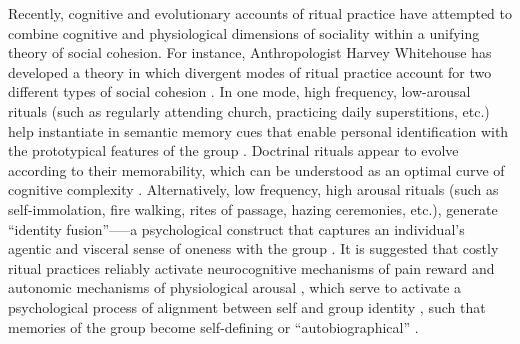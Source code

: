 \begin{CJK}{UTF8}{gbsn}
Recently, cognitive and evolutionary accounts of ritual practice have attempted to combine cognitive and physiological dimensions of sociality within a unifying theory of social cohesion.  For instance, Anthropologist Harvey Whitehouse has developed a theory in which divergent modes of ritual practice account for two different types of social cohesion \citep[commonly known as the ``modes theory''][]{Whitehouse1996,Whitehouse2004,Whitehouse2014}.  In one mode, high frequency, low-arousal rituals (such as regularly attending church, practicing daily superstitions, etc.) help instantiate in semantic memory cues that enable personal identification with the prototypical features of the group \cite[i.e., ``group identification,'' cf.][]{Turner1987}.  Doctrinal rituals appear to evolve according to their memorability, which can be understood as an optimal curve of cognitive complexity \citep[][]{Whitehouse2005}.  Alternatively, low frequency, high arousal rituals (such as self-immolation, fire walking, rites of passage, hazing ceremonies, etc.), generate ``identity fusion''—--a psychological construct that captures an individual’s agentic and visceral sense of oneness with the group \citep{Swann2009,Swann2015}.  It is suggested that costly ritual practices reliably activate neurocognitive mechanisms of pain reward \citep{Fischer2014a} and autonomic mechanisms of physiological arousal \citep{Swann2010,Jackson2018}, which serve to activate a psychological process of alignment between self and group identity \citep{Xygalatas2013}, such that memories of the group become self-defining or ``autobiographical'' \citep[see][]{Whitehouse2014}.


\end{CJK}
